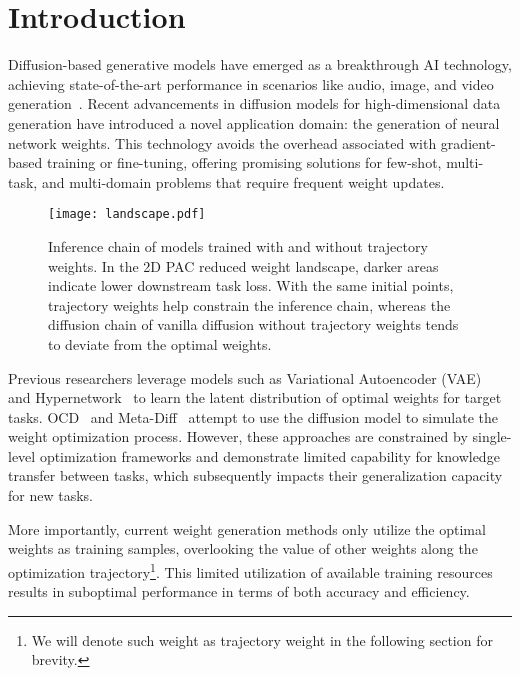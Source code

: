 \section{Introduction}
\label{sec:intro}
\label{sec:formatting}


Diffusion-based generative models have emerged as a breakthrough AI technology, achieving state-of-the-art performance in scenarios like audio, image, and video generation~\cite{generative_survey}. Recent advancements in diffusion models for high-dimensional data generation have introduced a novel application domain: the generation of neural network weights. This technology avoids the overhead associated with gradient-based training or fine-tuning, offering promising solutions for few-shot, multi-task, and multi-domain problems that require frequent weight updates.

\begin{figure}[t]
    \centering
    \texttt{[image: landscape.pdf]}
    \caption{Inference chain of models trained with and without trajectory weights. In the 2D PAC reduced weight landscape, darker areas indicate lower downstream task loss. With the same initial points, trajectory weights help constrain the inference chain, whereas the diffusion chain of vanilla diffusion without trajectory weights tends to deviate from the optimal weights.}
    \label{fig:landscape_2d}
\end{figure}

Previous researchers leverage models such as Variational Autoencoder (VAE)~\cite{VAE} and Hypernetwork~\cite{hypernetworks} to learn the latent distribution of optimal weights for target tasks. OCD~\cite{OCD} and Meta-Diff~\cite{MetaDiff} attempt to use the diffusion model to simulate the weight optimization process. However, these approaches are constrained by single-level optimization frameworks and demonstrate limited capability for knowledge transfer between tasks, which subsequently impacts their generalization capacity for new tasks. 

More importantly, current weight generation methods only utilize the optimal weights as training samples, overlooking the value of other weights along the optimization trajectory\footnote{We will denote such weight as trajectory weight in the following section for brevity.}. This limited utilization of available training resources results in suboptimal performance in terms of both accuracy and efficiency.

